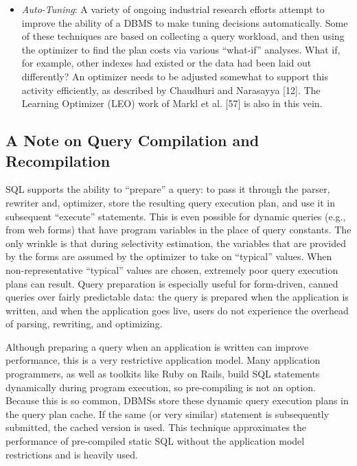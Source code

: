 \documentclass[a4paper,11pt,twoside,openright]{book}
\begin{document}
\begin{itemize}
\item
  \emph{Auto-Tuning}: A variety of ongoing industrial research efforts
  attempt to improve the ability of a DBMS to make tuning decisions
  automatically. Some of these techniques are based on collecting a
  query workload, and then using the optimizer to find the plan costs
  via various ``what-if'' analyses. What if, for example, other indexes
  had existed or the data had been laid out differently? An optimizer
  needs to be adjusted somewhat to support this activity efficiently, as
  described by Chaudhuri and Narasayya {[}12{]}. The Learning Optimizer
  (LEO) work of Markl et al. {[}57{]} is also in this vein.
\end{itemize}

\hypertarget{a-note-on-query-compilation-and-recompilation}{%
\subsection{A Note on Query Compilation and
Recompilation}\label{a-note-on-query-compilation-and-recompilation}}

SQL supports the ability to ``prepare'' a query: to pass it through the
parser, rewriter and, optimizer, store the resulting query execution
plan, and use it in subsequent ``execute'' statements. This is even
possible for dynamic queries (e.g., from web forms) that have program
variables in the place of query constants. The only wrinkle is that
during selectivity estimation, the variables that are provided by the
forms are assumed by the optimizer to take on ``typical'' values. When
non-representative ``typical'' values are chosen, extremely poor query
execution plans can result. Query preparation is especially useful for
form-driven, canned queries over fairly predictable data: the query is
prepared when the application is written, and when the application goes
live, users do not experience the overhead of parsing, rewriting, and
optimizing.

Although preparing a query when an application is written can improve
performance, this is a very restrictive application model. Many
application programmers, as well as toolkits like Ruby on Rails, build
SQL statements dynamically during program execution, so pre-compiling is
not an option. Because this is so common, DBMSs store these dynamic
query execution plans in the query plan cache. If the same (or very
similar) statement is subsequently submitted, the cached version is
used. This technique approximates the performance of pre-compiled static
SQL without the application model restrictions and is heavily used.
\end{document}
